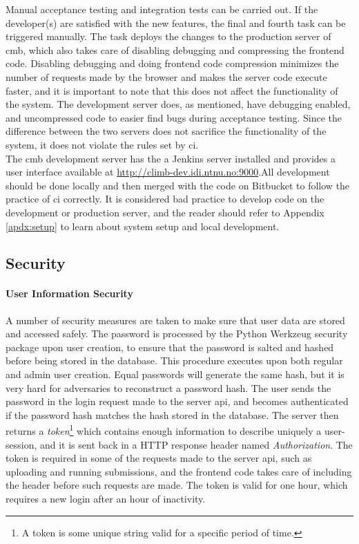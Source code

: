 Manual acceptance testing and integration tests can be carried out. If the developer(s) are satisfied with the new features, the final and fourth task can be triggered manually. The task deploys the changes to the production server of \gls{cmb}, which also takes care of disabling debugging and compressing the frontend code. Disabling debugging and doing frontend code compression minimizes the number of requests made by the browser and makes the server code execute faster, and it is important to note that this does not affect the functionality of the system. The development server does, as mentioned, have debugging enabled, and uncompressed code to easier find bugs during acceptance testing. Since the difference between the two servers does not sacrifice the functionality of the system, it does not violate the rules set by \gls{ci}.  \\

The \gls{cmb} development server has the a Jenkins server installed and provides a user interface available at \url{http://climb-dev.idi.ntnu.no:9000}.All development should be done locally and then merged with the code on Bitbucket to follow the practice of \gls{ci} correctly. It is considered bad practice to develop code on the development or production server, and the reader should refer to Appendix \ref{apdx:setup} to learn about system setup and local development.

\subsection{Security}

\paragraph*{User Information Security} A number of security measures are taken to make sure that user data are stored and accessed safely. The password is processed by the Python Werkzeug security package \cite{WERKZEUG} upon user creation, to ensure that the password is salted and hashed before being stored in the database. This procedure executes upon both regular and admin user creation. Equal passwords will generate the same hash, but it is very hard for adversaries to reconstruct a password hash. The user sends the password in the login request made to the server \gls{api}, and becomes authenticated if the password hash matches the hash stored in the database. The server then returns a \textit{token}\footnote{A token is some unique string valid for a specific period of time.} which contains enough information to describe uniquely a user-session, and it is sent back in a HTTP response header named \textit{Authorization}. The token is required in some of the requests made to the server \gls{api}, such as uploading and running submissions, and the frontend code takes care of including the header before such requests are made. The token is valid for one hour, which requires a new login after an hour of inactivity. \\


